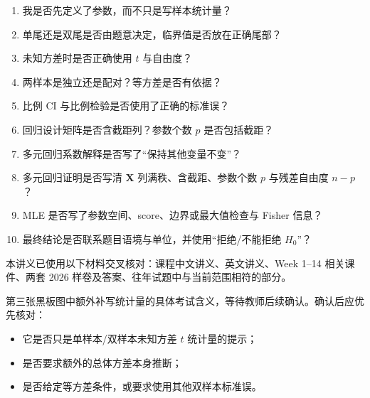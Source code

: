 \documentclass[11pt,a4paper]{article}
\newcommand{\1}{\mathbf{1}}
\newcommand{\bX}{\mathbf{X}}
\begin{document}
\begin{scopebox}[交卷前逐项检查]
\begin{enumerate}
  \item 我是否先定义了参数，而不只是写样本统计量？
  \item 单尾还是双尾是否由题意决定，临界值是否放在正确尾部？
  \item 未知方差时是否正确使用 $t$ 与自由度？
  \item 两样本是独立还是配对？等方差是否有依据？
  \item 比例 CI 与比例检验是否使用了正确的标准误？
  \item 回归设计矩阵是否含截距列？参数个数 $p$ 是否包括截距？
  \item 多元回归系数解释是否写了“保持其他变量不变”？
  \item 多元回归证明是否写清 $\bX$ 列满秩、含截距、参数个数 $p$ 与残差自由度 $n-p$？
  \item MLE 是否写了参数空间、score、边界或最大值检查与 Fisher 信息？
  \item 最终结论是否联系题目语境与单位，并使用“拒绝/不能拒绝 $H_0$”？
\end{enumerate}
\end{scopebox}

\begin{scopebox}[资料核对与暂留问题]
本讲义已使用以下材料交叉核对：课程中文讲义、英文讲义、Week 1--14 相关课件、两套 2026 样卷及答案、往年试题中与当前范围相符的部分。

第三张黑板图中额外补写统计量的具体考试含义，等待教师后续确认。确认后应优先核对：
\begin{itemize}
  \item 它是否只是单样本/双样本未知方差 $t$ 统计量的提示；
  \item 是否要求额外的总体方差本身推断；
  \item 是否给定等方差条件，或要求使用其他双样本标准误。
\end{itemize}
\end{scopebox}
\end{document}
